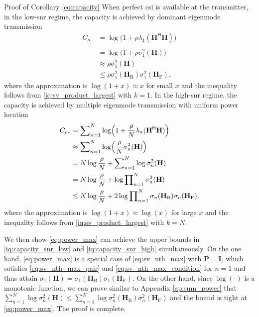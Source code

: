 \begin{appendix}
\begin{subsection}{Proof of Corollary \ref{co:capacity}}\label{ap:capacity}
	When perfect \gls{csi} is available at the transmitter, in the low-\gls{snr} regime, the capacity is achieved by dominant eigenmode transmission \cite[(5.26)]{Clerckx2013}
	\begin{align*}
		C_{\rho_\downarrow}
		 & = \log\bigl(1 + \rho \lambda_1(\mathbf{H}^\mathsf{H} \mathbf{H})\bigr)        \\
		 & = \log\bigl(1 + \rho \sigma_1^2(\mathbf{H})\bigr)                             \\
		 & \approx \rho \sigma_1^2(\mathbf{H})                                           \\
		 & \le \rho \sigma_1^2(\mathbf{H}_\mathrm{B}) \sigma_1^2(\mathbf{H}_\mathrm{F}),
	\end{align*}
	where the approximation is $\log(1 + x) \approx x$ for small $x$ and the inequality follows from \eqref{iq:sv_product_largest} with $k=1$.
	In the high-\gls{snr} regime, the capacity is achieved by multiple eigenmode transmission with uniform power location \cite[(5.27)]{Clerckx2013}
	\begin{align*}
		C_{\rho_\uparrow}
		 & = \sum\nolimits_{n=1}^N \log\Bigl(1 + \frac{\rho}{N} \lambda_n(\mathbf{H}^\mathsf{H} \mathbf{H})\Bigr)                     \\
		 & \approx \sum\nolimits_{n=1}^N \log\Bigl(\frac{\rho}{N} \sigma_n^2(\mathbf{H})\Bigr)                                        \\
		 & = N \log \frac{\rho}{N} + \sum\nolimits_{n=1}^N \log \sigma_n^2(\mathbf{H})                                                \\
		 & = N \log \frac{\rho}{N} + \log \prod\nolimits_{n=1}^N \sigma_n^2(\mathbf{H})                                               \\
		 & \le N \log \frac{\rho}{N} + 2 \log \prod\nolimits_{n=1}^N \sigma_n(\mathbf{H}_\mathrm{B}) \sigma_n(\mathbf{H}_\mathrm{F}),
	\end{align*}
	where the approximation is $\log(1 + x) \approx \log(x)$ for large $x$ and the inequality follows from \eqref{iq:sv_product_largest} with $k=N$.

	We then show \eqref{eq:power_max} can achieve the upper bounds in \eqref{iq:capacity_snr_low} and \eqref{iq:capacity_snr_high} simultaneously.
	On the one hand, \eqref{eq:power_max} is a special case of \eqref{eq:sv_nth_max} with $\mathbf{P} = \mathbf{I}$, which satisfies \eqref{eq:sv_nth_max_pair} and \eqref{eq:sv_nth_max_condition} for $n=1$ and thus attain $\sigma_1(\mathbf{H}) = \sigma_1(\mathbf{H}_\mathrm{B}) \sigma_1(\mathbf{H}_\mathrm{F})$.
	On the other hand, since $\log(\cdot)$ is a monotonic function, we can prove similar to Appendix \ref{ap:sum_power} that $\sum_{n=1}^N \log \sigma_n^2(\mathbf{H}) \le \sum_{n=1}^N \log \sigma_n^2(\mathbf{H}_\mathrm{B}) \sigma_n^2(\mathbf{H}_\mathrm{F})$ and the bound is tight at \eqref{eq:power_max}.
	The proof is complete.
\end{subsection}


\end{appendix}
